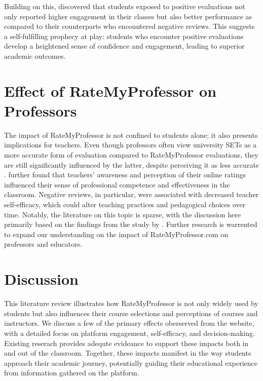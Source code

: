 \documentclass[man,12pt]{apa7}
\begin{document}
Building on this, \textcite{reber_perceptual_2017} discovered that students exposed to positive evaluations not only reported higher engagement in their classes but also better performance as compared to their counterparts who encountered negative reviews. This suggests a self-fulfilling prophecy at play: students who encounter positive evaluations develop a heightened sense of confidence and engagement, leading to superior academic outcomes.

\section{Effect of RateMyProfessor on Professors}
The impact of RateMyProfessor is not confined to students alone; it also presents implications for teachers. Even though professors often view university SETs as a more accurate form of evaluation compared to RateMyProfessor evaluations, they are still significantly influenced by the latter, despite perceiving it as less accurate \textcite{boswell_ratemyprofessors_2016}. \textcite{boswell_ratemyprofessors_2016} further found that teachers' awareness and perception of their online ratings influenced their sense of professional competence and effectiveness in the classroom. Negative reviews, in particular, were associated with decreased teacher self-efficacy, which could alter teaching practices and pedagogical choices over time. Notably, the literature on this topic is sparse, with the discussion here primarily based on the findings from the study by \textcite{boswell_ratemyprofessors_2016}. Further research is warrented to expand our understanding on the impact of RateMyProfessor.com on professors and educators.

\section{Discussion}

This literature review illustrates how RateMyProfessor is not only widely used by students but also influences their course selections and perceptions of courses and instructors. We discuss a few of the primary effects oberserved from the website, with a detailed focus on 
platform engagement, self-efficacy, and decision-making. Existing reserach provides adequte evideance to support these impacts both in and out of the classroom. Together, these impacts manifest in the way students approach their academic journey, potentially guiding their educational experience from information gathered on the platform. 
\end{document}
